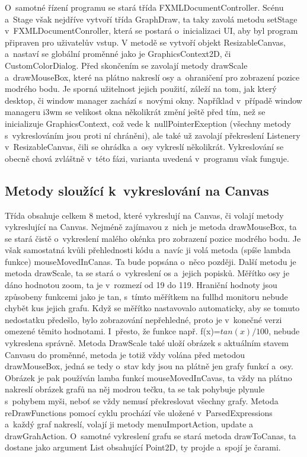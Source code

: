 \documentclass[a4paper,oneside,12p]{report}
\begin{document}
O~samotné řízení programu se stará třída FXMLDocumentController.
Scénu a~Stage však nejdříve vytvoří třída GraphDraw, ta taky zavolá metodu setStage v~FXMLDocumentConroller, která se postará o~inicializaci UI, aby byl program připraven pro uživatelův vstup.
V metodě se vytvoří objekt ResizableCanvas, a~nastaví se globální proměnné jako je GraphicsContext2D, či CustomColorDialog.
Před skončením se zavolají metody drawScale a~drawMouseBox, které na plátno nakreslí osy a~ohraničení pro zobrazení pozice modrého bodu.
Je sporná užitelnost jejich použití, záleží na tom, jak který desktop, či window manager zachází s~novými okny.
Například v~případě window manageru i3wm se velikost okna několikrát změní ještě před tím, než se inicializuje GraphicsContext, což vede k~nullPointerExeption (všechny metody s~vykreslováním jsou proti ní chráněni), ale také už zavolají překreslení Listenery v~ResizableCanvas, čili se ohrádka a~osy vykreslí několikrát.
Vykreslování se obecně chová zvláštně v~této fázi, varianta uvedená v~programu však funguje.

\subsection{Metody sloužící k~vykreslování na Canvas}

Třída obsahuje celkem 8 metod, které vykreslují na Canvas, či volají metody vykreslující na Canvas.
Nejméně zajímavou z~nich je metoda drawMouseBox, ta se stará čistě o~vykreslení malého okénka pro zobrazení pozice modrého bodu.
Je však samostatná kvůli přehlednosti kódu a~navíc ji volá metoda (spíše lambda funkce) mouseMovedInCanas.
Ta bude popsána o~něco později.
Další metodu je metoda drawScale, ta se stará o~vykreslení os a~jejich popisků.
Měřítko osy je dáno hodnotou zoom, ta je v~rozmezí od 19 do 119.
Hraniční hodnoty jsou způsobeny funkcemi jako je tan, s~tímto měřítkem na fullhd monitoru nebude chybět kus jejich grafu.
Když se měřítko nastavovalo automaticky, aby se tomuto nedostatku předešlo, bylo zobrazování nepřehledné, proto je v~konečné verzi omezené těmito hodnotami.
I~přesto, že funkce např. f(x)=$tan(x)/100$, nebude vykreslena správně.
Metoda DrawScale také uloží obrázek s aktuálním stavem Canvasu do proměnné, metoda je totiž vždy volána před metodou drawMouseBox, jedná se tedy o~stav kdy jsou na plátně jen grafy funkcí a~osy.
Obrázek je pak používán lamba funkcí mouseMovedInCavas, ta vždy na plátno nakreslí obrázek grafů na něj modrou tečku, ta se tak pohybuje plynule s~pohybem myši, neboť se vždy nemusí překreslovat všechny grafy.
Metoda reDrawFunctions pomocí cyklu prochází vše uložené v~ParsedExpressions a~každý graf nakreslí, volají ji metody menuImportAction, update a drawGrahAction.
O~samotné vykreslení grafu se stará metoda drawToCanas, ta dostane jako argument List obsahující Point2D, ty projde a~spojí je čarami.
\end{document}
